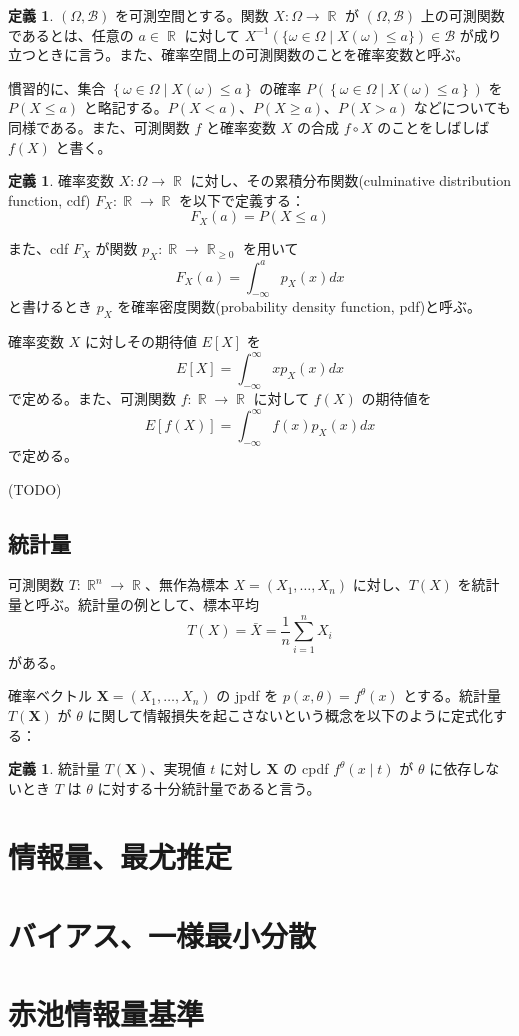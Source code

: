 \documentclass{jsarticle}
\DeclareMathOperator{\R}{\mathbb{R}}
\theoremstyle{definition}
\newtheorem{defn}[thm]{定義}
\begin{document}
\begin{defn}
  $(\Omega, \mathcal{B})$ を可測空間とする。関数 $X : \Omega \rightarrow \R$ が $(\Omega, \mathcal{B})$ 上の可測関数であるとは、任意の $a \in \R$ に対して $X^{-1}(\{\omega \in \Omega \mid X(\omega) \le a\}) \in \mathcal{B}$ が成り立つときに言う。また、確率空間上の可測関数のことを確率変数と呼ぶ。
\end{defn}

慣習的に、集合 $\left\{\omega \in \Omega \mid X(\omega) \le a\right\}$ の確率 $P(\left\{\omega \in \Omega \mid X(\omega) \le a\right\})$ を $P(X \le a)$ と略記する。$P(X < a)$、$P(X \ge a)$、$P(X > a)$ などについても同様である。また、可測関数 $f$ と確率変数 $X$ の合成 $f \circ X$ のことをしばしば $f(X)$ と書く。

\begin{defn}
  確率変数 $X : \Omega \rightarrow \R$ に対し、その累積分布関数(culminative distribution function, cdf) $F_X : \R \rightarrow \R$ を以下で定義する：
  \[
    F_X(a) = P(X \le a)
  \]

  また、cdf $F_X$ が関数 $p_X : \R \rightarrow \R_{\ge 0}$ を用いて
  \[
    F_X(a) = \int_{-\infty}^a p_X(x)dx
  \]
  と書けるとき $p_X$ を確率密度関数(probability density function, pdf)と呼ぶ。
\end{defn}

確率変数 $X$ に対しその期待値 $E\left[X\right]$ を
\[
  E\left[X\right] = \int_{-\infty}^\infty xp_X(x)dx
\]
で定める。また、可測関数 $f : \R \rightarrow \R$ に対して $f(X)$ の期待値を
\[
  E\left[f(X)\right] = \int_{-\infty}^\infty f(x)p_X(x)dx
\]
で定める。

(TODO)

\subsection{統計量}

可測関数 $T : \R^n \rightarrow \R$、無作為標本 $X = (X_1,\ldots,X_n)$ に対し、$T(X)$ を統計量と呼ぶ。統計量の例として、標本平均
\[
  T(X) = \bar{X} = \frac{1}{n}\sum_{i=1}^n X_i
\]
がある。

確率ベクトル $\mathbf{X} = (X_1 ,\ldots, X_n)$ の jpdf を $p(x, \theta) = f^\theta(x)$ とする。統計量 $T(\mathbf{X})$ が $\theta$ に関して情報損失を起こさないという概念を以下のように定式化する：
\begin{defn}
  統計量 $T(\mathbf{X})$、実現値 $t$ に対し $\mathbf X$ の cpdf $f^\theta(x\mid t)$ が $\theta$ に依存しないとき $T$ は $\theta$ に対する十分統計量であると言う。
\end{defn}

\section{情報量、最尤推定}

\section{バイアス、一様最小分散}

\section{赤池情報量基準}
\end{document}
